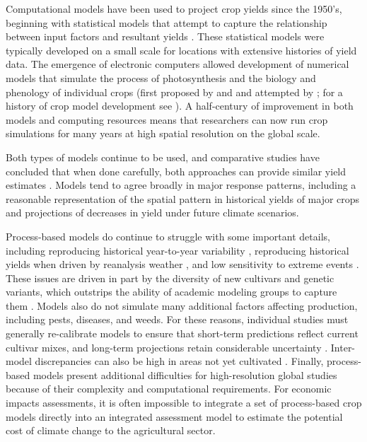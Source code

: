 \documentclass[preprint, 5p, times, twocolumn]{elsarticle}
\begin{document}
Computational models have been used to project crop yields since the 1950's, beginning with statistical models  that attempt to capture the relationship between input factors and resultant yields \citep[e.g.][]{Heady57, Heady61}. These statistical models were typically developed on a small scale for locations with extensive histories of yield data. The emergence of electronic computers allowed development of numerical models that simulate the process of photosynthesis and the biology and phenology of individual crops (first proposed by \citet{wit58} and \citet{Duncan67} and attempted by \citet{Duncan72}; for a history of crop model development see \citet{Rosenzweig2014}). A half-century of improvement in both models and computing resources means that researchers can now run crop simulations for many years at high spatial resolution on the global scale. 

Both types of models continue to be used, and comparative studies have concluded that when done carefully, both approaches can provide similar yield estimates \citep[e.g.][]{Lobell2010, Moore2017, Roberts2017, zhao2017}. Models tend to agree broadly in major response patterns, including a reasonable representation of the spatial pattern in historical yields of major crops \citep[e.g.][]{Elliott2015, muller_global_2017} and projections of decreases in yield under future climate scenarios.

Process-based models do continue to struggle with some important details, including reproducing historical year-to-year variability \citep[e.g.][]{muller_global_2017}, reproducing historical yields when driven by reanalysis weather \citep[e.g.][]{Glotter14}, and low sensitivity to extreme events \citep[e.g.][]{Glotter15}. These issues are driven in part by the diversity of new cultivars and genetic variants, which outstrips the ability of academic modeling groups to capture them \citep[e.g.][]{JONES2017b}. Models also do not simulate many additional factors affecting production, including pests, diseases, and weeds. For these reasons, individual studies must generally re-calibrate models to ensure that short-term predictions reflect current cultivar mixes, and long-term projections retain considerable uncertainty \citep{WOLF2002217, JAGTAP200273, Iizumi2010, ANGULO201332, Asseng2013, Asseng2015}. Inter-model discrepancies can also be high in areas not yet cultivated \citep[e.g.][]{Challinor2014, WHITE2011357}. Finally, process-based models present additional difficulties for high-resolution global studies because of their complexity and computational requirements. For economic impacts assessments, it is often impossible to integrate a set of process-based crop models directly into an integrated assessment model to estimate the potential cost of climate change to the agricultural sector.
\end{document}
